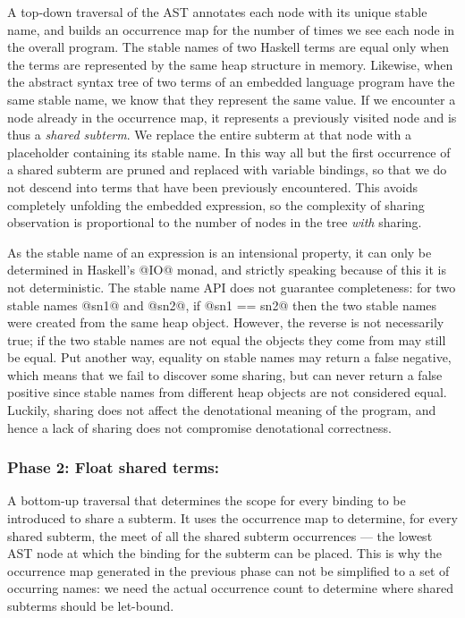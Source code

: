 A top-down traversal of the AST annotates each node
with its unique stable name, and builds an occurrence map for
the number of times we see each node in the overall program. The stable names of
two Haskell terms are equal only when the terms are represented by the same heap
structure in memory. Likewise, when the abstract syntax tree of two terms of an
embedded language program have the same stable name, we know that they represent
the same value. If we encounter a node already in the occurrence map, it represents a
previously visited node and is thus a \emph{shared subterm}. We replace the
entire subterm at that node with a placeholder containing its stable name. In
this way all but the first occurrence of a shared subterm are pruned and
replaced with variable bindings, so that we do not descend into terms that have
been previously encountered. This avoids completely unfolding the embedded
expression, so the complexity of sharing observation is proportional to the
number of nodes in the tree \emph{with} sharing.

As the stable name of an expression is an intensional property, it can only be
determined in Haskell's @IO@ monad, and strictly speaking because of this
it is not deterministic. The stable name API does not guarantee completeness:
for two stable names @sn1@ and @sn2@, if @sn1 == sn2@ then the
two stable names were created from the same heap object. However, the reverse is
not necessarily true; if the two stable names are not equal the objects they
come from may still be equal. Put another way, equality on stable names may
return a false negative, which means that we fail to discover some sharing, but
can never return a false positive since stable names from different heap objects
are not considered equal. Luckily, sharing does not affect the denotational
meaning of the program, and hence a lack of sharing does not compromise
denotational correctness.


\subsubsection*{Phase 2: Float shared terms:}

A bottom-up traversal that determines the scope for every binding to be
introduced to share a subterm. It uses the occurrence map to determine, for
every shared subterm, the meet of all the shared subterm occurrences --- the
lowest AST node at which the binding for the subterm can be placed. This is why
the occurrence map generated in the previous phase can not be simplified to
a set of occurring names: we need the actual occurrence count to determine where
shared subterms should be let-bound.


